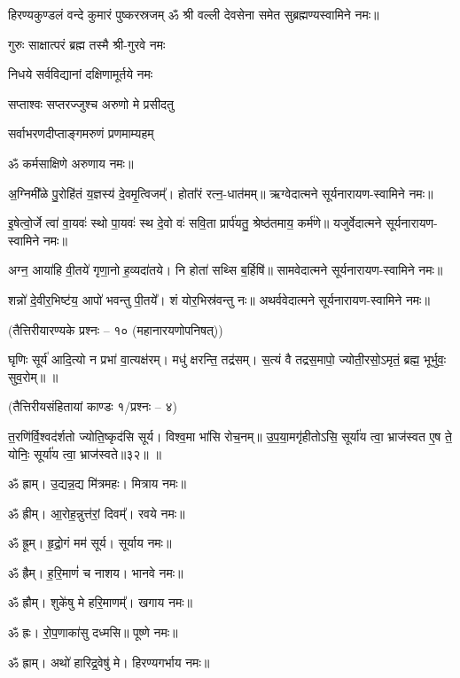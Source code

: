 {हिरण्यकुण्डलं वन्दे कुमारं पुष्करस्रजम्}
ॐ श्री वल्ली देवसेना समेत सुब्रह्मण्यस्वामिने नमः॥


{गुरुः साक्षात्परं ब्रह्म तस्मै श्री-गुरवे नमः}

{निधये सर्वविद्यानां दक्षिणामूर्तये नमः}

{सप्ताश्वः सप्तरज्जुश्च अरुणो मे प्रसीदतु}

{सर्वाभरणदीप्ताङ्गमरुणं प्रणमाम्यहम्}

ॐ कर्मसाक्षिणे अरुणाय नमः॥

अ॒ग्निमी᳚ळे पु॒रोहि॑तं य॒ज्ञस्य॑ दे॒वमृ॒त्विजम्᳚। होता᳚रं रत्न॒-धात॑मम्॥ ऋग्वेदात्मने सूर्यनारायण-स्वामिने नमः॥

इ॒षेत्वो॒र्जे त्वा॑ वा॒यवः॑ स्थो पा॒यवः॑ स्थ दे॒वो वः॑ सवि॒ता प्रार्प॑यतु॒ श्रेष्ठ॑तमाय॒ कर्म॑णे॥ यजुर्वेदात्मने सूर्यनारायण-स्वामिने नमः॥

अग्न॒ आया॑हि वी॒तये॑ गृणा॒नो ह॒व्यदा॑तये। नि होता॑ सथ्सि ब॒र्हिषि॑॥ सामवेदात्मने सूर्यनारायण-स्वामिने नमः॥

शन्नो॑ दे॒वीर॒भिष्ट॑य॒ आपो॑ भवन्तु पी॒तये᳚। शं योर॒भिस्र॑वन्तु नः॥ अथर्ववेदात्मने सूर्यनारायण-स्वामिने नमः॥


\centerline{\normalsize (तैत्तिरीयारण्यके प्रश्नः – १० (महानारयणोपनिषत्))}

घृणिः सूर्य॑ आदि॒त्यो न प्रभा॑ वा॒त्यक्ष॑रम्। 
मधु॑ क्षरन्ति॒ तद्र॑सम्। 
स॒त्यं वै तद्रस॒मापो॒ ज्योती॒रसो॒ऽमृतं॒ ब्रह्म॒ भूर्भुवः॒ सुव॒रोम्॥ \devAya{}॥ %


\centerline{\normalsize (तैत्तिरीयसंहितायां काण्डः १/प्रश्नः – ४)}
त॒रणि॑र्वि॒श्वद॑र्\mbox{}शतो ज्योति॒ष्कृद॑सि सूर्य। विश्व॒मा भा॑सि रोच॒नम्॥ उ॒प॒या॒मगृ॑हीतो\-ऽसि॒ सूर्या॑य त्वा॒ भ्राज॑स्वत ए॒ष ते॒ योनिः॒ सूर्या॑य त्वा॒ भ्राज॑स्वते॥३२॥
\devAya{}॥


ॐ ह्राम्।  उ॒द्यन्न॒द्य मि॑त्रमहः।  मित्राय नमः॥

ॐ ह्रीम्।  आ॒रोह॒न्नुत्त॑रां॒ दिवम्᳚। रवये नमः॥

ॐ ह्रूम्।  हृ॒द्रो॒गं मम॑ सूर्य। सूर्याय नमः॥

ॐ ह्रैम्।  ह॒रि॒माणं॑ च नाशय। भानवे नमः॥

ॐ ह्रौम्।  शुके॑षु मे हरि॒माणम्᳚। खगाय नमः॥

ॐ ह्रः। रो॒प॒णाका॑सु दध्मसि॥ पूष्णे नमः॥

ॐ ह्राम्।  अथो॑ हारिद्र॒वेषु॑ मे। हिरण्यगर्भाय नमः॥

